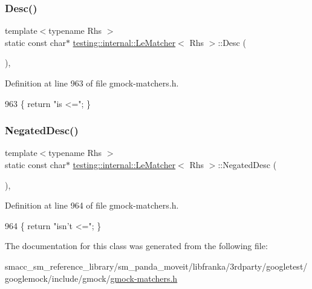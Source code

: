 \subsubsection{\texorpdfstring{Desc()}{Desc()}}
{\footnotesize\ttfamily template$<$typename Rhs $>$ \\
static const char$\ast$ \hyperlink{classtesting_1_1internal_1_1LeMatcher}{testing\+::internal\+::\+Le\+Matcher}$<$ Rhs $>$\+::Desc (\begin{DoxyParamCaption}{ }\end{DoxyParamCaption})\hspace{0.3cm}{\ttfamily [inline]}, {\ttfamily [static]}}



Definition at line 963 of file gmock-\/matchers.\+h.


\begin{DoxyCode}
963 \{ \textcolor{keywordflow}{return} \textcolor{stringliteral}{"is <="}; \}
\end{DoxyCode}
\mbox{\label{classtesting_1_1internal_1_1LeMatcher_a01dada192b6f7139b66bbc198b3cb03b}} 
\subsubsection{\texorpdfstring{Negated\+Desc()}{NegatedDesc()}}
{\footnotesize\ttfamily template$<$typename Rhs $>$ \\
static const char$\ast$ \hyperlink{classtesting_1_1internal_1_1LeMatcher}{testing\+::internal\+::\+Le\+Matcher}$<$ Rhs $>$\+::Negated\+Desc (\begin{DoxyParamCaption}{ }\end{DoxyParamCaption})\hspace{0.3cm}{\ttfamily [inline]}, {\ttfamily [static]}}



Definition at line 964 of file gmock-\/matchers.\+h.


\begin{DoxyCode}
964 \{ \textcolor{keywordflow}{return} \textcolor{stringliteral}{"isn't <="}; \}
\end{DoxyCode}


The documentation for this class was generated from the following file\+:\begin{DoxyCompactItemize}
\item 
smacc\+\_\+sm\+\_\+reference\+\_\+library/sm\+\_\+panda\+\_\+moveit/libfranka/3rdparty/googletest/googlemock/include/gmock/\hyperlink{gmock-matchers_8h}{gmock-\/matchers.\+h}\end{DoxyCompactItemize}

